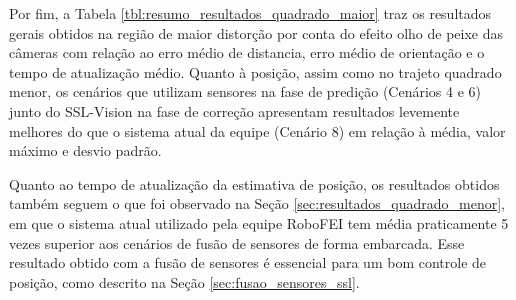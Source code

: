 \documentclass[acronym, symbols, table]{fei}
\begin{document}
		Por fim, a Tabela \ref{tbl:resumo_resultados_quadrado_maior} traz os resultados gerais obtidos na região de maior distorção por conta do efeito olho de peixe das câmeras com relação ao erro médio de distancia, erro médio de orientação e o tempo de atualização médio. Quanto à posição, assim como no trajeto quadrado menor, os cenários que utilizam sensores na fase de predição (Cenários 4 e 6) junto do SSL-Vision na fase de correção apresentam resultados levemente melhores do que o sistema atual da equipe (Cenário 8) em relação à média, valor máximo e desvio padrão.
		
		Quanto ao tempo de atualização da estimativa de posição, os resultados obtidos também seguem o que foi observado na Seção \ref{sec:resultados_quadrado_menor}, em que o sistema atual utilizado pela equipe RoboFEI tem média praticamente 5 vezes superior aos cenários de fusão de sensores de forma embarcada. Esse resultado obtido com a fusão de sensores é essencial para um bom controle de posição, como descrito na Seção \ref{sec:fusao_sensores_ssl}.
	
\end{document}
